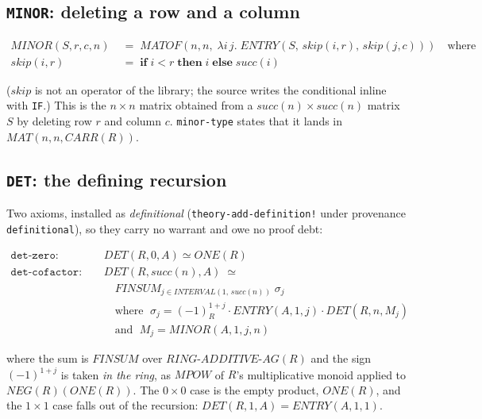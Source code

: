 \subsection{\texttt{MINOR}: deleting a row and a column}

\begin{align*}
  \mathit{MINOR}(S, r, c, n) &\;=\;
  \mathit{MATOF}(n, n,\; \lambda i\, j.\;
    \mathit{ENTRY}(S,\, \mathit{skip}(i,r),\, \mathit{skip}(j,c)))
  \quad\text{where}\\
  \mathit{skip}(i, r) &\;=\;
    \mathbf{if}\; i < r \;\mathbf{then}\; i \;\mathbf{else}\; \mathit{succ}(i)
\end{align*}

\noindent
($\mathit{skip}$ is not an operator of the library; the source writes the
conditional inline with \texttt{IF}.)  This is
the $n \times n$ matrix obtained from a
$\mathit{succ}(n) \times \mathit{succ}(n)$ matrix $S$ by deleting row $r$
and column $c$.  \texttt{minor-type} states that it lands in
$\mathit{MAT}(n, n, \mathit{CARR}(R))$.

\subsection{\texttt{DET}: the defining recursion}

Two axioms, installed as \emph{definitional}
(\texttt{theory-add-definition!} under provenance \texttt{definitional}),
so they carry no warrant and owe no proof debt:

\begin{align*}
\mathtt{det\text{-}zero}: &\quad \mathit{DET}(R, 0, A) \simeq \mathit{ONE}(R) \\
\mathtt{det\text{-}cofactor}: &\quad
  \mathit{DET}(R, \mathit{succ}(n), A) \;\simeq\; {} \\
 &\qquad \textstyle\mathit{FINSUM}_{j \in \mathit{INTERVAL}(1,\,\mathit{succ}(n))}\;
   \sigma_j \\
 &\qquad\text{where }\;
   \sigma_j = (-1)^{1+j}_{R} \cdot \mathit{ENTRY}(A, 1, j) \cdot
   \mathit{DET}(R, n, M_j) \\
 &\qquad\text{and }\; M_j = \mathit{MINOR}(A, 1, j, n)
\end{align*}

\noindent
where the sum is $\mathit{FINSUM}$ over $\mathit{RING\text{-}ADDITIVE\text{-}AG}(R)$
and the sign $(-1)^{1+j}$ is taken \emph{in the ring}, as
$\mathit{MPOW}$ of $R$'s multiplicative monoid applied to
$\mathit{NEG}(R)(\mathit{ONE}(R))$.  The $0 \times 0$ case is the empty
product, $\mathit{ONE}(R)$, and the $1 \times 1$ case falls out of the
recursion: $\mathit{DET}(R,1,A) = \mathit{ENTRY}(A,1,1)$.

